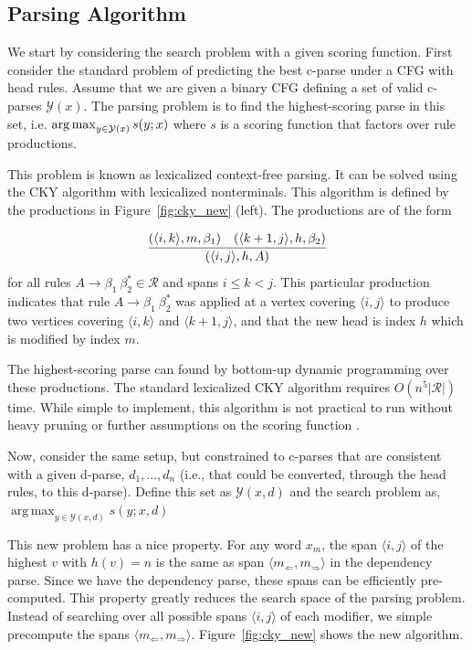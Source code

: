 \documentclass[11pt,letterpaper]{article}
\DeclareMathOperator*{\argmax}{arg\,max}
\newcommand{\rules}{\mathcal{R}}
\newcommand{\Left}[1]{#1_{\Leftarrow}}
\newcommand{\Right}[1]{#1_{\Rightarrow}}
\newcommand{\Span}[1]{\langle #1 \rangle}
\newcommand{\RuleB}[3]{#1 \rightarrow #2\ #3^*}
\begin{document}
\subsection{Parsing Algorithm}
We start by considering the search problem with a given scoring function.
First consider the standard problem of predicting the best c-parse under a CFG with head rules. 
Assume that we are given a binary CFG defining a set of valid c-parses $\mathcal{Y}(x)$.
The parsing problem is to find the highest-scoring parse in this set, i.e.  $ \argmax_{y \in {\cal Y}(x)} s(y;x) $ where
$s$ is a scoring function that factors over rule productions.

This problem is known as lexicalized context-free parsing. It can be
solved using the  CKY algorithm with lexicalized nonterminals.
This algorithm is defined by the productions
in Figure~\ref{fig:cky_new} (left). The productions are of the form

\[ \infer{(\Span{i, j}, h, A)}{(\Span{i, k}, m, \beta_1) & (\Span{k+1,
    j}, h, \beta_2)} \] for all rules $\RuleB{A}{\beta_1}{\beta_2}\in
\rules$ and spans $i \leq k < j$. This particular production indicates that
rule $\RuleB{A}{\beta_1}{\beta_2}$ was applied at a vertex covering
$\Span{i, j}$ to produce two vertices covering $\Span{i, k}$ and
$\Span{k+1, j}$, and that the new head is index $h$ which is modified
by index $m$.

The highest-scoring parse can found by bottom-up dynamic programming
over these productions. The standard lexicalized CKY algorithm requires $O(n^5
|\rules|)$ time. While simple to implement, this algorithm is not practical to run without heavy pruning or
further assumptions on the scoring function \cite{eisner1999efficient}. 

Now, consider the same setup, but constrained to c-parses
that are consistent with a given d-parse, $d_1, \ldots, d_n$ (i.e.,
that could be converted, through the head rules, to this d-parse).
Define this set as  $\mathcal{Y}(x,d)$ and the search problem as,
$  \argmax_{y \in \mathcal{Y}(x, d)} s(y; x, d)$



This new problem has a nice property. For any word $x_m$, the span $\Span{i,j}$ of the highest $v$ with $h(v) = n$  is the same as span $\Span{\Left{m},\Right{m}}$ in the dependency parse. Since we have the dependency parse, these spans can be efficiently pre-computed.
This property greatly reduces the search space of the parsing problem.
Instead of searching over all possible spans $\Span{i, j}$ of each
modifier, we simple precompute the spans $\langle
\Left{m},\Right{m}\rangle$. Figure~\ref{fig:cky_new} shows the new
algorithm.
\end{document}
